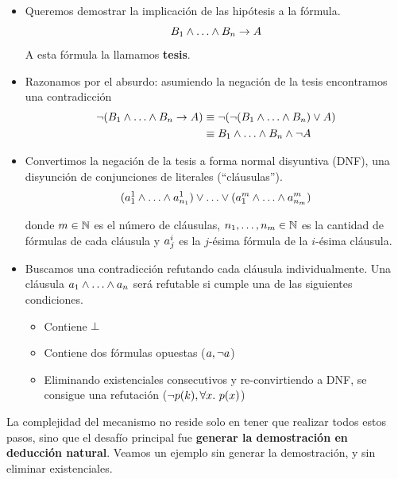\begin{itemize}
    \item Queremos demostrar la implicación de las hipótesis a la fórmula.
    \[
        \formTwo_1 \fAnd \dots \fAnd \formTwo_n \fImp \form
    \]
    A esta fórmula la llamamos \textbf{tesis}.
    \item Razonamos por el absurdo: asumiendo la negación de la tesis encontramos una contradicción
    \begin{align*}
        \fNot (\formTwo_1 \fAnd \dots \fAnd \formTwo_n \fImp \form)
        &\equiv \fNot (\fNot (\formTwo_1 \fAnd \dots \fAnd \formTwo_n) \fOr \form)\\
        &\equiv \formTwo_1 \fAnd \dots \fAnd \formTwo_n \fAnd \fNot \form
    \end{align*}
    \item Convertimos la negación de la tesis a forma normal disyuntiva (DNF),
    una disyunción de conjunciones de literales (``cláusulas'').
    \[
        (\formLit^1_{1} \fAnd \dots \fAnd \formLit^1_{n_1})
        \fOr \dots \fOr
        (\formLit^m_{1} \fAnd \dots \fAnd \formLit^m_{n_m})
    \]

    donde $m \in \mathbb{N}$ es el número de cláusulas, $n_1, \dots, n_m \in
    \mathbb{N}$ es la cantidad de fórmulas de cada cláusula y $a^i_j$
    es la $j$-ésima fórmula de la $i$-ésima cláusula.

    \item Buscamos una contradicción refutando cada cláusula individualmente.
    Una cláusula $\formLit_1 \fAnd \dots \fAnd \formLit_n$ será refutable si
    cumple una de las siguientes condiciones.
    \begin{itemize}
        \item Contiene $\bot$
        \item Contiene dos fórmulas opuestas ($a, \neg a$)
        \item Eliminando existenciales consecutivos y re-convirtiendo a DNF, se
        consigue una refutación ($\neg p(k), \forall x .\ p(x)$)
    \end{itemize}
\end{itemize}

La complejidad del mecanismo no reside solo en tener que realizar todos estos
pasos, sino que el desafío principal fue \textbf{generar la demostración en
deducción natural}. Veamos un ejemplo sin generar la demostración, y sin
eliminar existenciales.

